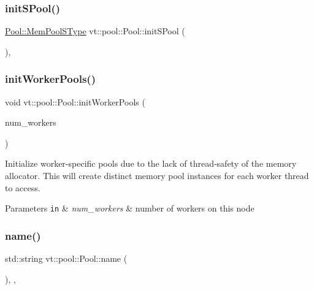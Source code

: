 \subsubsection{\texorpdfstring{init\+S\+Pool()}{initSPool()}}
{\footnotesize\ttfamily \hyperlink{structvt_1_1pool_1_1_pool_a9f94985824d12c43357cfe50eaaefd38}{Pool\+::\+Mem\+Pool\+S\+Type} vt\+::pool\+::\+Pool\+::init\+S\+Pool (\begin{DoxyParamCaption}{ }\end{DoxyParamCaption})\hspace{0.3cm}{\ttfamily [static]}, {\ttfamily [private]}}

\mbox{\label{structvt_1_1pool_1_1_pool_aeb8ad6a3ac3cf168dc4f2d2be2714edc}} 
\subsubsection{\texorpdfstring{init\+Worker\+Pools()}{initWorkerPools()}}
{\footnotesize\ttfamily void vt\+::pool\+::\+Pool\+::init\+Worker\+Pools (\begin{DoxyParamCaption}\item[{\hyperlink{namespacevt_aa93398ea48f2cb6c188512250f7cc248}{Worker\+Count\+Type} const \&}]{num\+\_\+workers }\end{DoxyParamCaption})}



Initialize worker-\/specific pools due to the lack of thread-\/safety of the memory allocator. This will create distinct memory pool instances for each worker thread to access. 


\begin{DoxyParams}[1]{Parameters}
\mbox{\tt in}  & {\em num\+\_\+workers} & number of workers on this node \\
\hline
\end{DoxyParams}
\mbox{\label{structvt_1_1pool_1_1_pool_a02fa54fc3cca0d388f25f397dfd997ab}} 
\subsubsection{\texorpdfstring{name()}{name()}}
{\footnotesize\ttfamily std\+::string vt\+::pool\+::\+Pool\+::name (\begin{DoxyParamCaption}{ }\end{DoxyParamCaption})\hspace{0.3cm}{\ttfamily [inline]}, {\ttfamily [override]}, {\ttfamily [virtual]}}



